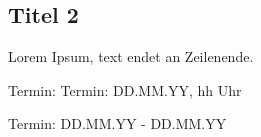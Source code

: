 
\subsection{Titel 2}
Lorem Ipsum, text endet an Zeilenende.


\begin{termine}
\item Termin: Termin: DD.MM.YY, hh Uhr
  \item Termin: DD.MM.YY - DD.MM.YY
\end{termine}


